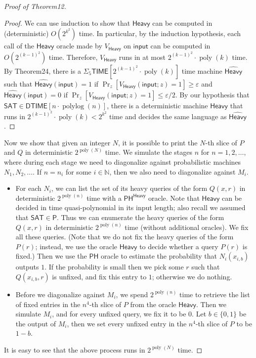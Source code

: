 \begin{proof}[Proof of Theorem12]
\begin{proof}
We can use induction to show that $\mathsf{Heavy}$ can be computed in (deterministic) $O(2^{k^2})$ time. In particular, by the induction hypothesis, each call of the $\mathsf{Heavy}$ oracle made by $V_{\mathsf{Heavy}}$ on $\mathsf{input}$ can be computed in $O(2^{(k-1)^2})$ time. Therefore, $V_{\mathsf{Heavy}}$ runs in at most $2^{(k-1)^2}\cdot\operatorname{poly}(k)$ time. By Theorem24, there is a $\Sigma_5\mathsf{TIME}[2^{(k-1)^2}\cdot\operatorname{poly}(k)]$ time machine $\widehat{\mathsf{Heavy}}$ such that $\widehat{\mathsf{Heavy}}(\mathsf{input})=1$ if $\Pr_z[V_{\mathsf{Heavy}}(\mathsf{input};z)=1]\geq\varepsilon$ and $\widehat{\mathsf{Heavy}}(\mathsf{input})=0$ if $\Pr_z[V_{\mathsf{Heavy}}(\mathsf{input};z)=1]\leq\varepsilon/2$. By our hypothesis that $\mathsf{SAT}\in\mathsf{DTIME}[n\cdot\operatorname{polylog}(n)]$, there is a deterministic machine $\mathsf{Heavy}$ that runs in $2^{(k-1)^2}\cdot\operatorname{poly}(k)<2^{k^2}$ time and decides the same language as $\widehat{\mathsf{Heavy}}$.
\end{proof}
Now we show that given an integer $N$, it is possible to print the $N$-th slice of $P$ and $Q$ in deterministic $2^{\operatorname{poly}(N)}$ time. We simulate the stages $n$ for $n=1,2,\ldots$, where during each stage we need to diagonalize against probabilistic machines $N_1,N_2,\ldots$. If $n=n_i$ for some $i\in\mathbb N$, then we also need to diagonalize against $M_i$.
\begin{itemize}
\item For each $N_i$, we can list the set of its heavy queries of the form $Q(x,r)$ in deterministic $2^{\operatorname{poly}(n)}$ time with a $\mathsf{PH}^{\mathsf{Heavy}}$ oracle. Note that $\mathsf{Heavy}$ can be decided in time quasi-polynomial in its input length; also recall we assumed that $\mathsf{SAT}\in\mathsf P$. Thus we can enumerate the heavy queries of the form $Q(x,r)$ in deterministic $2^{\operatorname{poly}(n)}$ time (without additional oracles). We fix all these queries. (Note that we do not fix the heavy queries of the form $P(r)$; instead, we use the oracle $\mathsf{Heavy}$ to decide whether a query $P(r)$ is fixed.) Then we use the $\mathsf{PH}$ oracle to estimate the probability that $N_i(x_{i,b})$ outputs $1$. If the probability is small then we pick some $r$ such that $Q(x_{i,b},r)$ is unfixed, and fix this entry to $1$; otherwise we do nothing.
\item Before we diagonalize against $M_i$, we spend $2^{\operatorname{poly}(n)}$ time to retrieve the list of fixed entries in the $n^4$-th slice of $P$ from the oracle $\mathsf{Heavy}$. Then we simulate $M_i$, and for every unfixed query, we fix it to be $0$. Let $b\in\{0,1\}$ be the output of $M_i$, then we set every unfixed entry in the $n^4$-th slice of $P$ to be $1-b$.
\end{itemize}
It is easy to see that the above process runs in $2^{\operatorname{poly}(N)}$ time.
\end{proof}
